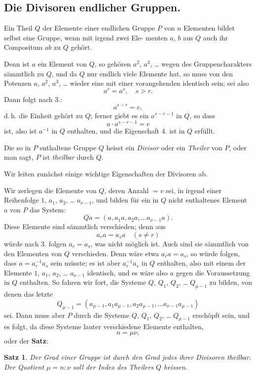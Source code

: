 \documentclass[12pt,a4paper]{article}
\theoremstyle{plain}
\newtheorem{satz}{Satz}[section]
\theoremstyle{definition}
\theoremstyle{remark}
\begin{document}
\subsection*{Die Divisoren endlicher Gruppen.}

Ein Theil $Q$ der Elemente einer endlichen Gruppe $P$ von
$n$ Elementen bildet selbst eine Gruppe, wenn mit irgend zwei Ele-
menten $a$, $b$ aus $Q$ auch ihr Compositum $ab$ zu $Q$ gehört.

Denn ist $a$ ein Element von $Q$, so gehören $a^2$, $a^3$, \dots{} wegen
des Gruppencharakters sämmtlich zu $Q$, und da $Q$ nur endlich
viele Elemente hat, so muss von den Potenzen $a$, $a^2$, $a^3$, \dots{}
wieder eine mit einer vorangehenden identisch sein; sei also
\[
a^r = a^s, \quad s > r.
\]
Dann folgt nach 3.:
\[
a^{s-r} = e,
\]
d.\,h. die Einheit gehört zu $Q$; ferner giebt es ein $a^{s-r-1}$ in $Q$,
so dass
\[
a \cdot a^{s-r-1} = e
\]
ist, also ist $a^{-1}$ in $Q$ enthalten, und die Eigenschaft 4. ist
in $Q$ erfüllt.

Die so in $P$ enthaltene Gruppe $Q$ heisst ein \emph{Divisor}
oder ein \emph{Theiler} von $P$, oder man sagt, $P$ ist \emph{theilbar} durch $Q$.

Wir leiten zunächst einige wichtige Eigenschaften der
Divisoren ab.

Wir zerlegen die Elemente von $Q$, deren Anzahl $= v$ sei,
in irgend einer Reihenfolge $1$, $a_1$, $a_2$, \dots{} $a_{\nu-1}$, und bilden
für ein in $Q$ nicht enthaltenes Element $a$ von $P$ das System:
\[
Qa = (a, a_1 a, a_2 a, \dots{} a_{\nu-1} a).
\]
Diese Elemente sind sämmtlich verschieden; denn aus
\[
a_r a = a_s a \quad (s \neq r)
\]
würde nach 3. folgen $a_r = a_s$, was nicht möglich ist. Auch
sind sie sämmtlich von den Elementen von $Q$ verschieden. Denn
wäre etwa $a_r a = a_s$, so würde folgen, dass $a = a_r^{-1} a_s$ sein
müsste; es ist aber $a_r^{-1} a_s$ in $Q$ enthalten, also mit einem der
Elemente $1$, $a_1$, $a_2$, \dots{} $a_{\nu-1}$ identisch, und es wäre also $a$
gegen die Voraussetzung in $Q$ enthalten. So fahren wir fort,
die Systeme $Q$, $Q_1$, $Q_2$, \dots{} $Q_{\mu-1}$ zu bilden, von denen das
letzte
\[
Q_{\mu-1} = (a_{\mu-1}, a_1 a_{\mu-1}, a_2 a_{\mu-1}, \dots{} a_{\nu-1} a_{\mu-1})
\]
sei. Dann muss aber $P$ durch die Systeme $Q$, $Q_1$, $Q_2$, \dots{}
$Q_{\mu-1}$ erschöpft sein, und es folgt, da diese Systeme lauter
verschiedene Elemente enthalten,
\[
n = \mu\nu,
\]
oder der \textbf{Satz}:

\begin{satz}
Der Grad einer Gruppe ist durch den Grad jedes ihrer Divisoren theilbar. Der Quotient $\mu = n:\nu$ soll der \emph{Index} des Theilers $Q$ heissen.
\end{satz}
\end{document}
